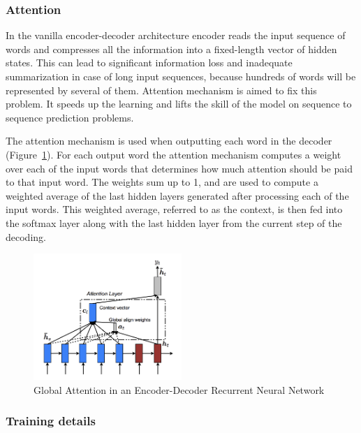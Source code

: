 \subsubsection{Attention} \label{attention}
In the vanilla encoder-decoder architecture encoder reads the input sequence of words and compresses all the information into a fixed-length vector of hidden states. This can lead to significant information loss and inadequate summarization in case of long input sequences, because hundreds of words will be represented by several of them. Attention mechanism is aimed to fix this problem. It speeds up the learning and lifts the skill of the model on sequence to sequence prediction problems. 

The attention mechanism is used when outputting each word in the decoder (Figure~\ref{fig:attention}). For each output word the attention mechanism computes a weight over each of the input words that determines how much attention should be paid to that input word. The weights sum up to 1, and are used to compute a weighted average of the last hidden layers generated after processing
each of the input words. This weighted average, referred to as the context, is then fed into the softmax layer along with the last hidden layer from the current step of the decoding.

\begin{figure}[h]
\centering
	\includegraphics[width=0.5\textwidth]{img/seq2seq-with-attention.png}
	\caption{\label{fig:attention}Global Attention in an Encoder-Decoder Recurrent Neural Network}
\end{figure}


\subsubsection{Training details}

